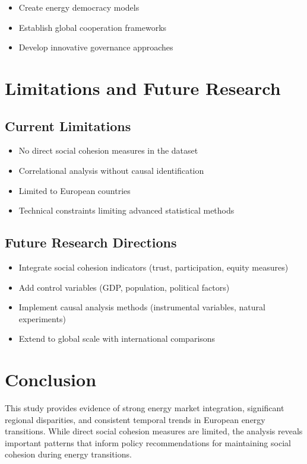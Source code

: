 \documentclass[11pt,a4paper]{article}
\begin{document}
\begin{itemize}
\item Create energy democracy models
\item Establish global cooperation frameworks
\item Develop innovative governance approaches
\end{itemize}

\section{Limitations and Future Research}

\subsection{Current Limitations}

\begin{itemize}
\item No direct social cohesion measures in the dataset
\item Correlational analysis without causal identification
\item Limited to European countries
\item Technical constraints limiting advanced statistical methods
\end{itemize}

\subsection{Future Research Directions}

\begin{itemize}
\item Integrate social cohesion indicators (trust, participation, equity measures)
\item Add control variables (GDP, population, political factors)
\item Implement causal analysis methods (instrumental variables, natural experiments)
\item Extend to global scale with international comparisons
\end{itemize}

\section{Conclusion}

This study provides evidence of strong energy market integration, significant regional disparities, and consistent temporal trends in European energy transitions. While direct social cohesion measures are limited, the analysis reveals important patterns that inform policy recommendations for maintaining social cohesion during energy transitions.
\end{document}
